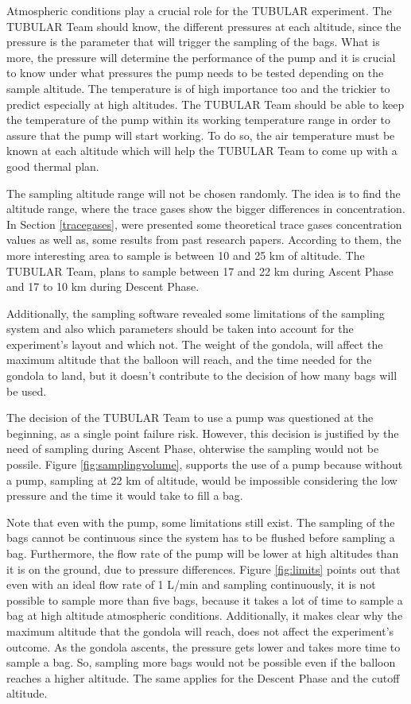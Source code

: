 \documentclass[a4paper,12pt,twoside]{article}
\begin{document}
\begin{appendices}
Atmospheric conditions play a crucial role for the TUBULAR experiment. The TUBULAR Team should know, the different pressures at each altitude, since the pressure is the parameter that will trigger the sampling of the bags. What is more, the pressure will determine the performance of the pump and it is crucial to know under what pressures the pump needs to be tested depending on the sample altitude. The temperature is of high importance too and the trickier to predict especially at high altitudes. The TUBULAR Team should be able to keep the temperature of the pump within its working temperature range in order to assure that the pump will start working. To do so, the air temperature must be known at each altitude which will help the TUBULAR Team to come up with a good thermal plan. 

The sampling altitude range will not be chosen randomly. The idea is to find the altitude range, where the trace gases show the bigger differences in concentration. In Section \ref{tracegases}, were presented some theoretical trace gases concentration values as well as, some results from past research papers. According to them, the more interesting area to sample is between 10 and 25 km of altitude. The TUBULAR Team, plans to sample between 17 and 22 km during Ascent Phase and 17 to 10 km during Descent Phase. 

Additionally, the sampling software revealed some limitations of the sampling system and also which parameters should be taken into account for the experiment's layout and which not. 
The weight of the gondola, will affect the maximum altitude that the balloon will reach, and the time needed for the gondola to land, but it doesn't contribute to the decision of how many bags will be used.

The decision of the TUBULAR Team to use a pump was questioned at the beginning, as a single point failure risk. However, this decision is justified by the need of sampling during Ascent Phase, ohterwise the sampling would not be possile.  Figure \ref{fig:samplingvolume}, supports the use of a pump because without a pump, sampling at 22 km of altitude, would be impossible considering the low pressure and the time it would take to fill a bag. 

Note that even with the pump, some limitations still exist. The sampling of the bags cannot be continuous since the system has to be flushed before sampling a bag. Furthermore, the flow rate of the pump will be lower at high altitudes than it is on the ground, due to pressure differences. Figure \ref{fig:limits} points out that even with an ideal flow rate of 1 L/min and sampling continuously, it is not possible to sample more than five bags, because it takes a lot of time to sample a bag at high altitude atmospheric conditions. Additionally, it makes clear why the maximum altitude that the gondola will reach, does not affect the experiment's outcome. As the gondola ascents, the pressure gets lower and takes more time to sample a bag. So, sampling more bags would not be possible even if the balloon reaches a higher altitude. The same applies for the Descent Phase and the cutoff altitude. 


\end{appendices}
\end{document}
